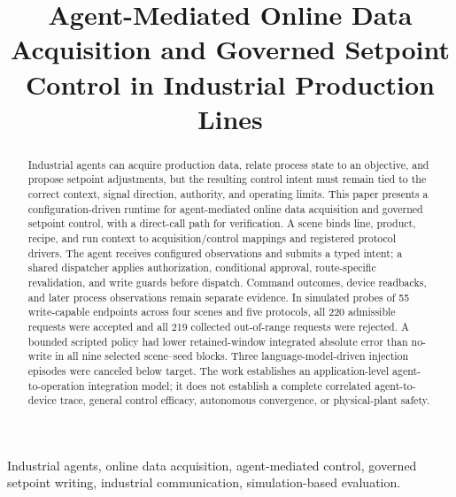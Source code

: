 \documentclass[journal]{IEEEtran}
\begin{document}

\title{Agent-Mediated Online Data Acquisition and Governed Setpoint Control in Industrial Production Lines}

\author{}

\maketitle

\begin{abstract}
Industrial agents can acquire production data, relate process state to an objective, and propose setpoint adjustments, but the resulting control intent must remain tied to the correct context, signal direction, authority, and operating limits. This paper presents a configuration-driven runtime for agent-mediated online data acquisition and governed setpoint control, with a direct-call path for verification. A scene binds line, product, recipe, and run context to acquisition/control mappings and registered protocol drivers. The agent receives configured observations and submits a typed intent; a shared dispatcher applies authorization, conditional approval, route-specific revalidation, and write guards before dispatch. Command outcomes, device readbacks, and later process observations remain separate evidence. In simulated probes of 55 write-capable endpoints across four scenes and five protocols, all 220 admissible requests were accepted and all 219 collected out-of-range requests were rejected. A bounded scripted policy had lower retained-window integrated absolute error than no-write in all nine selected scene--seed blocks. Three language-model-driven injection episodes were canceled below target. The work establishes an application-level agent-to-operation integration model; it does not establish a complete correlated agent-to-device trace, general control efficacy, autonomous convergence, or physical-plant safety.
\end{abstract}

\begin{IEEEkeywords}
Industrial agents, online data acquisition, agent-mediated control, governed setpoint writing, industrial communication, simulation-based evaluation.
\end{IEEEkeywords}

\IEEEpeerreviewmaketitle
\end{document}
